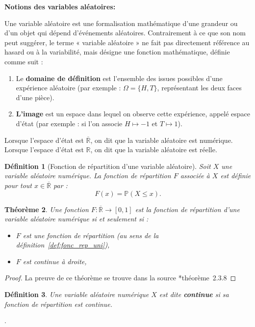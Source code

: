 \documentclass[a4paper,11pt]{amsbook}
\numberwithin{equation}{chapter}
\newtheorem{theoreme}			     {Théorème}	[chapter]
\newtheorem{definition}	[theoreme]   {Définition}
\theoremstyle{definition}
\begin{document}
\textbf{Notions des variables aléatoires:}


Une variable aléatoire est une formalisation mathématique d’une grandeur ou d’un objet qui dépend d’événements aléatoires.  
Contrairement à ce que son nom peut suggérer, le terme « variable aléatoire » ne fait pas directement référence au hasard ou à la variabilité, mais désigne une fonction mathématique, définie comme suit :

\begin{enumerate}
    \item Le \textbf{domaine de définition} est l’ensemble des issues possibles d’une expérience aléatoire (par exemple : \(\Omega=\{H, T\}\), représentant les deux faces d’une pièce).
    \item \textbf{L’image} est un espace dans lequel on observe cette expérience, appelé espace d’état (par exemple : si l’on associe \(H \mapsto -1\) et \(T \mapsto 1\)).
\end{enumerate}

Lorsque l’espace d’état est \(\overline{\mathbb{R}}\), on dit que la variable aléatoire est numérique. Lorsque l’espace d’état est \({\mathbb{R}}\), on dit que la variable aléatoire est réelle.

\begin{definition}[Fonction de répartition d'une variable aléatoire]\label{def:fonc_va}
Soit \(X\) une variable aléatoire numérique. La fonction de répartition \(F\) associée à \(X\) est définie pour tout \(x \in \overline{\mathbb{R}}\) par :
\[
F(x) = \mathbb{P}(X \leq x).
\]
\end{definition}

\begin{theoreme}\label{thm:fonc_va}
Une fonction \(F : \overline{\mathbb{R}} \to [0,1]\) est la fonction de répartition d’une variable aléatoire numérique si et seulement si :
\begin{itemize}
    \item \(F\) est une fonction de répartition (au sens de la définition~\ref{def:fonc_rep_uni}),
    \item \(F\) est continue à droite,
\end{itemize}
\end{theoreme}

\begin{proof}
La preuve de ce théorème se trouve dans la source \cite{barigou}*{théorème~2.3.8}
\end{proof}

\begin{definition}
Une variable aléatoire numérique \( X \) est dite \textbf{continue} si sa fonction de répartition est continue.
\end{definition}.
\end{document}
